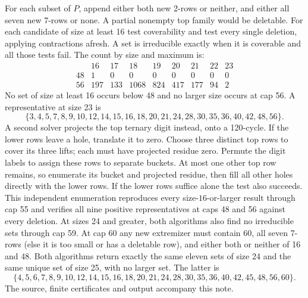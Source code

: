 \documentclass[10pt]{article}
\begin{document}
For each subset of $P$, append either both new 2-rows or neither, and either all seven new 7-rows or none. A partial nonempty top family would be deletable. For each candidate of size at least 16 test coverability and test every single deletion, applying contractions afresh. A set is irreducible exactly when it is coverable and all those tests fail. The count by size and maximum is:
\[
\begin{array}{c|rrrrrrrr}
 &16&17&18&19&20&21&22&23\\\hline
48&1&0&0&0&0&0&0&0\\
56&197&133&1068&824&417&177&94&2
\end{array}
\]
No set of size at least 16 occurs below 48 and no larger size occurs at cap 56. A representative at size 23 is
\[
 \{3,4,5,7,8,9,10,12,14,15,16,18,20,21,24,28,30,35,36,40,42,48,56\}.
\]
A second solver projects the top ternary digit instead, onto a 120-cycle. If the lower rows leave a hole, translate it to zero. Choose three distinct top rows to cover its three lifts; each must have projected residue zero. Permute the digit labels to assign these rows to separate buckets. At most one other top row remains, so enumerate its bucket and projected residue, then fill all other holes directly with the lower rows. If the lower rows suffice alone the test also succeeds. This independent enumeration reproduces every size-$16$-or-larger result through cap 55 and verifies all nine positive representatives at caps 48 and 56 against every deletion. At sizes 24 and greater, both algorithms also find no irreducible sets through cap 59. At cap 60 any new extremizer must contain 60, all seven 7-rows (else it is too small or has a deletable row), and either both or neither of 16 and 48. Both algorithms return exactly the same eleven sets of size 24 and the same unique set of size 25, with no larger set. The latter is
\[
 \{4,5,6,7,8,9,10,12,14,15,16,18,20,21,24,28,30,35,36,40,42,45,48,56,60\}.
\]
The source, finite certificates and output accompany this note.




\end{document}
